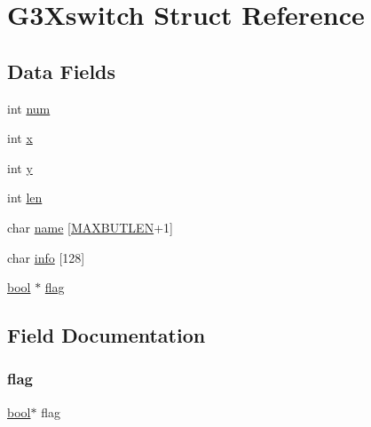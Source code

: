 \hypertarget{struct_g3_xswitch}{}\section{G3\+Xswitch Struct Reference}
\label{struct_g3_xswitch}
\subsection*{Data Fields}
\begin{DoxyCompactItemize}
\item 
int \hyperlink{struct_g3_xswitch_a86cf672daa4e0ad11ad10efc894d19c8}{num}
\item 
int \hyperlink{struct_g3_xswitch_a6150e0515f7202e2fb518f7206ed97dc}{x}
\item 
int \hyperlink{struct_g3_xswitch_a0a2f84ed7838f07779ae24c5a9086d33}{y}
\item 
int \hyperlink{struct_g3_xswitch_afed088663f8704004425cdae2120b9b3}{len}
\item 
char \hyperlink{struct_g3_xswitch_aa998d085055b9e9634ea1781cc0163c7}{name} \mbox{[}\hyperlink{g3x__switch_8c_a0e40ba0c0da54aafd8c34999455ec4fa}{M\+A\+X\+B\+U\+T\+L\+EN}+1\mbox{]}
\item 
char \hyperlink{struct_g3_xswitch_aef383a8ccd6a48889b57cb6ceb7091f6}{info} \mbox{[}128\mbox{]}
\item 
\hyperlink{g3x__types_8h_af6a258d8f3ee5206d682d799316314b1}{bool} $\ast$ \hyperlink{struct_g3_xswitch_a16a9b47d5bb16c05344c6601f74e24cf}{flag}
\end{DoxyCompactItemize}


\subsection{Field Documentation}
\mbox{\label{struct_g3_xswitch_a16a9b47d5bb16c05344c6601f74e24cf}} 
\subsubsection{\texorpdfstring{flag}{flag}}
{\footnotesize\ttfamily \hyperlink{g3x__types_8h_af6a258d8f3ee5206d682d799316314b1}{bool}$\ast$ flag}

\mbox{\label{struct_g3_xswitch_aef383a8ccd6a48889b57cb6ceb7091f6}} 

